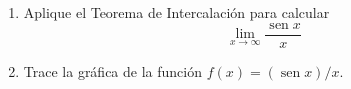 \item 
\begin{enumerate}
        \item[(a)] Aplique el Teorema de Intercalación para calcular 
        $$\lim_{x \to \infty} \frac{\operatorname{sen} x}{x}$$
        \item[(b)] Trace la gráfica de la función $f(x) = (\operatorname{sen} x) / x$.
    \end{enumerate}
